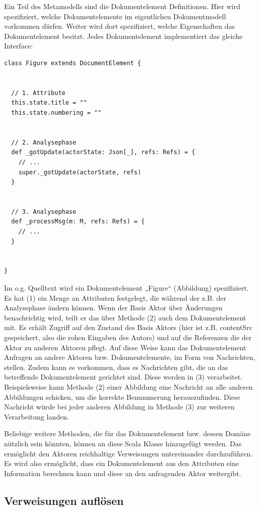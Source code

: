 Ein Teil des Metamodells sind die Dokumentelement Definitionen. Hier wird spezifiziert, welche Dokumentelemente im eigentlichen Dokumentmodell vorkommen dürfen. Weiter wird dort spezifiziert, welche Eigenschaften das Dokumentelement besitzt. Jedes Dokumentelement implementiert das gleiche Interface:

 
\begin{verbatim}
class Figure extends DocumentElement {


  // 1. Attribute
  this.state.title = ""
  this.state.numbering = ""


  // 2. Analysephase
  def _gotUpdate(actorState: Json[_], refs: Refs) = {
    // ...
    super._gotUpdate(actorState, refs)
  }


  // 3. Analysephase
  def _processMsg(m: M, refs: Refs) = {
    // ...
  }


}
\end{verbatim}
 
Im o.g. Quelltext wird ein Dokumentelement „Figure“ (Abbildung) spezifiziert. Es hat (1) ein Menge an Attributen festgelegt, die während der z.B. der Analysephase ändern können. Wenn der Basis Aktor über Änderungen benachrichtig wird, teilt er das über Methode (2) auch dem Dokumentelement mit. Es erhält Zugriff auf den Zustand des Basis Aktors (hier ist z.B. contentSrc gespeichert, also die rohen Eingaben des Autors) und auf die Referenzen die der Aktor zu anderen Aktoren pflegt. Auf diese Weise kann das Dokumentelement Anfragen an andere Aktoren bzw. Dokumentelemente, im Form von Nachrichten, stellen. Zudem kann es vorkommen, dass es Nachrichten gibt, die an das betreffende Dokumentelement gerichtet sind. Diese werden in (3) verarbeitet. Beispielsweise kann Methode (2) einer Abbildung eine Nachricht an alle anderen Abbildungen schicken, um die korrekte Benummerung herauszufinden. Diese Nachricht würde bei jeder anderen Abbildung in Methode (3) zur weiteren Verarbeitung landen.

 
Beliebige weitere Methoden, die für das Dokumentelement bzw. dessen Domäne nützlich sein könnten, können an diese Scala Klasse hinzugefügt werden. Das ermöglicht den Aktoren reichhaltige Verweisungen untereinander durchzuführen. Es wird also ermöglicht, dass ein Dokumentelement aus den Attributen eine Information berechnen kann und diese an den anfragenden Aktor weitergibt.

 
\subsection{Verweisungen auflösen}\label{verweise-aufloesen}
 
